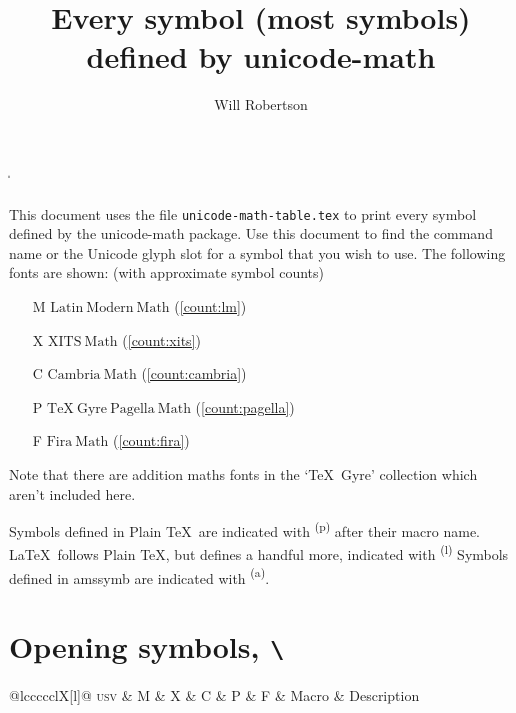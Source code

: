 \documentclass[final]{article}
\makeatletter
\def\cmd#1{\texttt{\textbackslash\expandafter\@gobble\string#1}}
\newcounter{#1}
\def\INPUT{}
\def\TABLE{%
  \par\noindent
  \begin{longtabu}[l]{@{}lccccclX[l]@{}}
    \toprule
    \textsc{usv} & M & X & C & P & F & Macro & Description \\
    \midrule \endhead
    \INPUT\\
    \bottomrule
  \end{longtabu}
}
\def\USV#1{\footnotesize\scshape\MakeLowercase{u+\@gobble#1}}
\def\CMD#1{\footnotesize\cmd#1}
\def\DESC#1{%
  \begin{spacing}{0.5}
    \RaggedRight\scriptsize #1%
  \end{spacing}
}
\newcommand\SHOW[1]{%
  \def\UnicodeMathSymbol##1##2##3##4{%
    \def\1{#1}\def\2{##3}%
    \ifx\1\2\PRINTLINE{##1}{##2}{##4}\fi
  }%
  \TABLE
}
\def\PRINTLINE#1#2#3{
    \def\tempa{
      \USV{#1} &
      \SYMB{#2}{lm}{#1} &
      \SYMB{#2}{xits}{#1} &
      \SYMB{#2}{cambria}{#1} &
      \SYMB{#2}{pagella}{#1} &
      \SYMB{#2}{fira}{#1} &
      \CMD{#2}
      \tl_if_in:NnT \PLAIN {#2}
        {
          \makebox[0pt][l]
            { \color[gray]{0.7} \textsuperscript{\sffamily (p)} }
        }
      \tl_if_in:NnT \LTXSYM {#2}
        {
          \makebox[0pt][l]
            { \color[gray]{0.7} \textsuperscript{\sffamily (l)} }
        }
      \tl_if_in:NnT \AMSSYMB {#2}
        {
          \makebox[0pt][l]
            { \color[gray]{0.7} \textsuperscript{\sffamily (a)} }
        }
      &
      \DESC{#3} \\
    }%
    \expandafter\tempa
}
\def\SYMB#1#2#3{%
  \expandafter\iffontchar\csname#2\endcsname #3\relax
    \refstepcounter{#2}%
    \mathversion{#2}%
    $\displaystyle#1$%
  \fi
}
\def\PLAIN{\alpha\beta\gamma\delta\epsilon\zeta\eta\theta\iota\kappa\lambda\mu\nu\xi\pi\rho\sigma\tau\upsilon\phi\chi\psi\omega\varepsilon\vartheta\varpi\varrho\varsigma\varphi\Gamma\Delta\Theta\Lambda\Xi\Pi\Sigma\Upsilon\Phi\Psi\Omega
%
\aleph\hbar\imath\jmath\ell\wp\Re\Im\partial\infty\prime\emptyset\nabla\surd\top\bot\angle\triangle\forall\exists\neg\flat\natural\sharp\clubsuit\diamondsuit\heartsuit\spadesuit
%
\coprod\bigvee\bigwedge\biguplus\bigcap\bigcup\int\prod\sum\bigotimes\bigoplus\bigodot\oint\bigsqcup\smallint
%
\triangleleft\triangleright\bigtriangleup\bigtriangledown\wedge\land\vee\lor\cap\cup\ddagger\dagger\sqcap\sqcup\uplus\amalg\diamond\bullet\wr\div\odot\oslash\otimes\ominus\oplus\mp\pm\circ\bigcirc\setminus\cdot\ast\times\star\propto\sqsubseteq\sqsupseteq\parallel\mid\dashv\vdash\nearrow\searrow\nwarrow\swarrow\Leftrightarrow\Leftarrow\Rightarrow\neq\ne\lnot\leq\le\geq\ge\succ\prec\approx\succeq\preceq\supset\subset\supseteq\subseteq\in\ni\owns\gg\ll\not\leftrightarrow\leftarrow\gets\rightarrow\to\mapstochar\mapsto\sim\simeq\perp\equiv\asymp\smile\frown\leftharpoonup\leftharpoondown\rightharpoonup\rightharpoondown
%
\joinrel\relbar\Relbar\lhook\hookrightarrow\rhook\hookleftarrow\bowtie\models\Longrightarrow\longrightarrow\longleftarrow\Longleftarrow\longmapsto\longleftrightarrow\Longleftrightarrow\iff
%
\ldotp\cdotp\colon\ldots\cdots\vdots\ddots
%
\acute\grave\ddot\tilde\bar\breve\check\hat\vec\dot\widetilde\widehat
%
\overrightarrow\overleftarrow\overbrace\underbrace\lmoustache\rmoustache\lgroup\rgroup\arrowvert\Arrowvert\bracevert\Vert\vert\uparrow\downarrow\updownarrow\Uparrow\Downarrow\Updownarrow\backslash\rangle\langle\rbrace\lbrace\rceil\lceil\rfloor\lfloor\sqrt}
\def\LTXSYM{
\cong
\notin
\rightleftharpoons
\doteq
\mathring
}
\def\AMSSYMB{\boxdot\boxplus\boxtimes\square\blacksquare\centerdot\lozenge\blacklozenge\circlearrowright\circlearrowleft\leftrightharpoons\boxminus\Vdash\Vvdash\vDash\twoheadrightarrow\twoheadleftarrow\leftleftarrows\rightrightarrows\upuparrows\downdownarrows\upharpoonright\restriction\downharpoonright\upharpoonleft\downharpoonleft\rightarrowtail\leftarrowtail\leftrightarrows\rightleftarrows\Lsh\Rsh\rightsquigarrow\leftrightsquigarrow\looparrowleft\looparrowright\circeq\succsim\gtrsim\gtrapprox\multimap\therefore\because\doteqdot\Doteq\triangleq\precsim\lesssim\lessapprox\eqslantless\eqslantgtr\curlyeqprec\curlyeqsucc\preccurlyeq\leqq\leqslant\lessgtr\backprime\risingdotseq\fallingdotseq\succcurlyeq\geqq\geqslant\gtrless\vartriangleright\vartriangleleft\trianglerighteq\trianglelefteq\bigstar\between\blacktriangledown\blacktriangleright\blacktriangleleft\vartriangle\blacktriangle\triangledown\eqcirc\lesseqgtr\gtreqless\lesseqqgtr\gtreqqless\Rrightarrow\Lleftarrow\veebar\barwedge\doublebarwedge\measuredangle\sphericalangle\varpropto\smallsmile\smallfrown\Subset\Supset\Cup\doublecup\Cap\doublecap\curlywedge\curlyvee\leftthreetimes\rightthreetimes\subseteqq\supseteqq\bumpeq\Bumpeq\lll\llless\ggg\gggtr\circledS\pitchfork\dotplus\backsim\backsimeq\complement\intercal\circledcirc\circledast\circleddash\lvertneqq\gvertneqq\nleq\ngeq\nless\ngtr\nprec\nsucc\lneqq\gneqq\nleqslant\ngeqslant\lneq\gneq\npreceq\nsucceq\precnsim\succnsim\lnsim\gnsim\nleqq\ngeqq\precneqq\succneqq\precnapprox\succnapprox\lnapprox\gnapprox\nsim\ncong\diagup\diagdown\varsubsetneq\varsupsetneq\nsubseteqq\nsupseteqq\subsetneqq\supsetneqq\varsubsetneqq\varsupsetneqq\subsetneq\supsetneq\nsubseteq\nsupseteq\nparallel\nmid\nshortmid\nshortparallel\nvdash\nVdash\nvDash\nVDash\ntrianglerighteq\ntrianglelefteq\ntriangleleft\ntriangleright\nleftarrow\nrightarrow\nLeftarrow\nRightarrow\nLeftrightarrow\nleftrightarrow\divideontimes\varnothing\nexists\Finv\Game\eth\eqsim\beth\gimel\daleth\lessdot\gtrdot\ltimes\rtimes\shortmid\shortparallel\smallsetminus\thicksim\thickapprox\approxeq\succapprox\precapprox\curvearrowleft\curvearrowright\digamma\varkappa\Bbbk\hslash\backepsilon}
\makeatother
\begin{document}
\MakeShortVerb\|
\title{Every symbol (most symbols) defined by \textsf{unicode-math}}
\author{Will Robertson}
\maketitle

This document uses the file \texttt{unicode-math-table.tex}
to print every symbol defined by the \textsf{unicode-math}
package.
Use this document to find the command name or the Unicode glyph slot for a symbol that you wish to use.
The following fonts are shown: (with approximate symbol counts)
\begin{itemize}
\item[M]  $\mathup{Latin\ Modern\ Math}$ (\ref{count:lm})
\item[X]  $\mathup{XITS\ Math}$ (\ref{count:xits})
\item[C]  $\mathup{Cambria\ Math}$ (\ref{count:cambria})
\item[P]  $\mathup{TeX\ Gyre\ Pagella\ Math}$ (\ref{count:pagella})
\item[F]  $\mathup{Fira\ Math}$ (\ref{count:fira})
\end{itemize}
Note that there are addition maths fonts in the `\TeX\ Gyre' collection which aren't included here.

Symbols defined in Plain \TeX\ are indicated with {\color[gray]{0.6} \textsuperscript{\sffamily (p)}} after their macro name.
\LaTeX\ follows Plain \TeX, but defines a handful more, indicated with {\color[gray]{0.6} \textsuperscript{\sffamily (l)}}
Symbols defined in \textsf{amssymb} are indicated with {\color[gray]{0.6} \textsuperscript{\sffamily (a)}}.

\tableofcontents

\clearpage
\section{Opening symbols, \cmd\mathopen}
\begingroup
\def\sqrt{\sqrtsign{}}
\def\longdivision{\longdivisionsign{}}
\SHOW\mathopen
\endgroup
\end{document}
